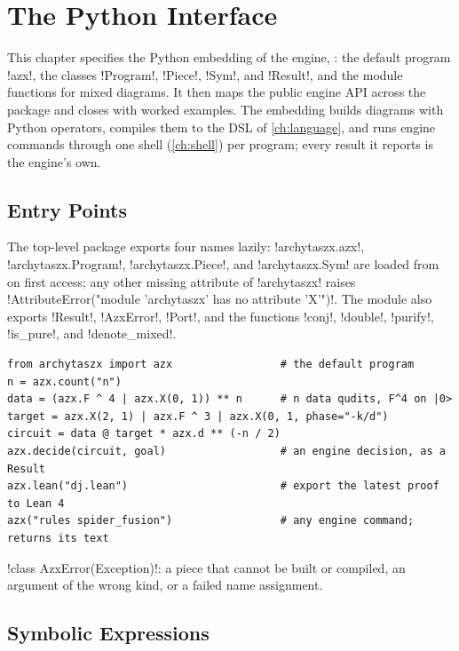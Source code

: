 \chapter{The Python Interface}\label{ch:python-api}

This chapter specifies the Python embedding of the engine, : the default program \py!azx!, the classes \py!Program!, \py!Piece!, \py!Sym!, and \py!Result!, and the module functions for mixed diagrams. It then maps the public engine API across the package and closes with worked examples. The embedding builds diagrams with Python operators, compiles them to the DSL of \cref{ch:language}, and runs engine commands through one shell (\cref{ch:shell}) per program; every result it reports is the engine's own.

\section{Entry Points}\label{sec:python-api-entry}

The top-level package exports four names lazily: \py!archytaszx.azx!, \py!archytaszx.Program!, \py!archytaszx.Piece!, and \py!archytaszx.Sym! are loaded from  on first access; any other missing attribute of \py!archytaszx! raises \code!AttributeError("module 'archytaszx' has no attribute 'X'")!. The module also exports \py!Result!, \py!AzxError!, \py!Port!, and the functions \py!conj!, \py!double!, \py!purify!, \py!is_pure!, and \py!denote_mixed!.

\begin{lstlisting}[style=python]
from archytaszx import azx                 # the default program
n = azx.count("n")
data = (azx.F ^ 4 | azx.X(0, 1)) ** n      # n data qudits, F^4 on |0>
target = azx.X(2, 1) | azx.F ^ 3 | azx.X(0, 1, phase="-k/d")
circuit = data @ target * azx.d ** (-n / 2)
azx.decide(circuit, goal)                  # an engine decision, as a Result
azx.lean("dj.lean")                        # export the latest proof to Lean 4
azx("rules spider_fusion")                 # any engine command; returns its text
\end{lstlisting}

\begin{signature}
\py!class AzxError(Exception)!: a piece that cannot be built or compiled, an argument of the wrong kind, or a failed name assignment.
\end{signature}

\section{Symbolic Expressions}\label{sec:python-api-sym}

